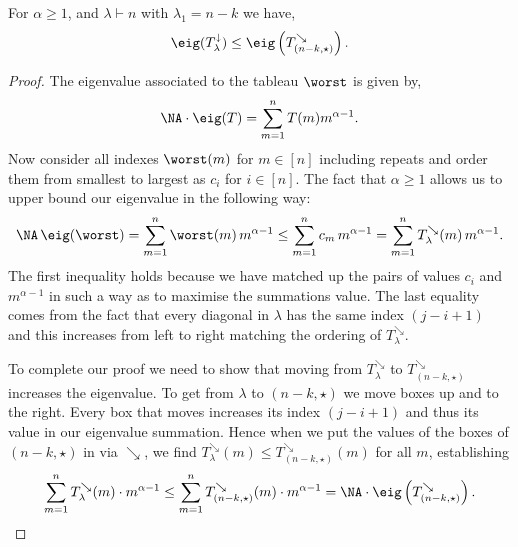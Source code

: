 \documentclass[11pt]{report}
\begin{document}
\begin{lemma}
	\label{lem:eigbound}
	For $\alpha \geq1$, and  $\lambda \vdash n$ with $\lambda_{1} =n-k$ we 
	have, 
	\[\eig(T_{\lambda}^{\downarrow}) \leq 
	\eig\left(T_{(n-k,\star)}^{\searrow}\right) .\]
\end{lemma}
\begin{proof}
	
	
	The eigenvalue associated to the tableau $\worst$ is given by,
	\[\NA \cdot \eig(T) = 	\sum_{m=1}^{n} T(m) m^{\alpha-1}.\]
	Now consider all indexes  $\worst(m)$ for $m \in [n]$ including repeats and order them from smallest to largest as $c_{i}$ for $i \in [n]$.  The fact that $\alpha \geq 1$ allows us to upper bound our eigenvalue in the following 
	way: \[\NA \,\eig(\worst)  = \sum_{m=1}^{n} \worst(m) \, 
	m^{\alpha-1} \leq \sum_{m=1}^{n} c_{m} \, 
	m^{\alpha-1} =\sum_{m=1}^{n} T_{\lambda}^{\searrow}(m) \, 
	m^{\alpha-1} .\]
	The first inequality holds because we have matched up the pairs of values $c_{i}$ and $m^{\alpha-1}$ in such a way as to maximise the summations value.
	The last equality comes from the fact that every diagonal in $\lambda$ has the same index $(j-i+1)$ and this increases from left to right matching the ordering of	$T_{\lambda}^{\searrow}$.
	
	To complete our proof we need to show that moving from $T_{\lambda}^{\searrow}$ to 	$T_{(n-k,\star)}^{\searrow}$ increases the eigenvalue. To get from $\lambda$ to $(n-k,\star)$ we move boxes up and to the right. Every box that moves increases its index $(j-i+1)$ and thus its value in our eigenvalue summation. Hence when we put the values of the boxes of 
	$(n-k,\star)$  in via $\searrow$, we find $T_{\lambda}^{\searrow}(m) \leq 
	T_{(n-k,\star)}^{\searrow}(m)$ for all $m$, 
	establishing
	\[\sum_{m=1}^{n} T_{\lambda}^{\searrow}(m) \cdot 
	m^{\alpha-1} \leq \sum_{m=1}^{n} T_{(n-k,\star)}^{\searrow}(m) \cdot 
	m^{\alpha-1} = 	\NA \cdot \eig\left(T_{(n-k,\star)}^{\searrow}\right). 
	\qedhere\] 
\end{proof}
\end{document}
